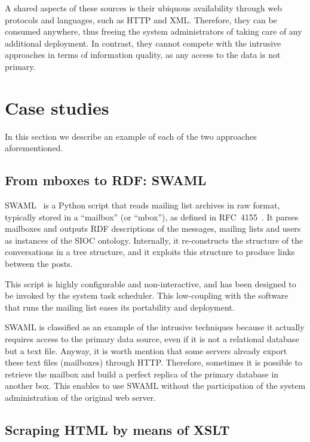 \documentclass{../templates/www2008-submission}
\begin{document}
A shared aspects of these sources is their ubiquous availability through
web protocols and languages, such as HTTP and XML. Therefore, they
can be consumed anywhere, thus freeing the system administrators of
taking care of any additional deployment. In contrast, they cannot compete
with the intrusive approaches in terms of information quality, as
any access to the data is not primary.

\section{Case studies}

In this section we describe an example of each of the two approaches
aforementioned.

\subsection{From mboxes to RDF: SWAML}

SWAML~\cite{SWAML2007} is a Python script that reads mailing 
list archives in raw format, typically stored in a ``mailbox'' 
(or ``mbox''), as defined in RFC~4155~\cite{RFC4155}. It parses
mailboxes and outputs RDF descriptions of the messages, mailing lists
and users as instances of the SIOC ontology. Internally, it re-constructs
the structure of the conversations in a tree structure, and it exploits
this structure to produce links between the posts.

This script is highly configurable and non-interactive, and has been
designed to be invoked by the system task scheduler. This low-coupling with
the software that runs the mailing list eases its portability and
deployment.

SWAML is classified as an example of the intrusive techniques because
it actually requires access to the primary data source, even if
it is not a relational database but a text file. Anyway, it is
worth mention that some servers already export these text files
(mailboxes) through HTTP. Therefore, sometimes it is possible to
retrieve the mailbox and build a perfect replica of the primary
database in another box. This enables to use SWAML without the
participation of the system administration of the original
web server.

\subsection{Scraping HTML by means of XSLT}
\end{document}
